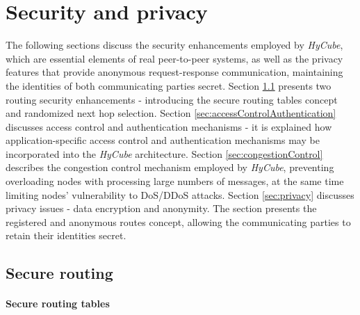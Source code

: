 
\chapter{Security and privacy}
\label{sec:security}

The following sections discuss the security enhancements employed by \emph{HyCube}, which are essential elements of real peer-to-peer systems, as well as the privacy features that provide anonymous request-response communication, maintaining the identities of both communicating parties secret. Section \ref{sec:secureRouting} presents two routing security enhancements - introducing the secure routing tables concept and randomized next hop selection. Section \ref{sec:accessControlAuthentication} discusses access control and authentication mechanisms - it is explained how application-specific access control and authentication mechanisms may be incorporated into the \emph{HyCube} architecture. Section \ref{sec:congestionControl} describes the congestion control mechanism employed by \emph{HyCube}, preventing overloading nodes with processing large numbers of messages, at the same time limiting nodes' vulnerability to DoS/DDoS attacks. Section \ref{sec:privacy} discusses privacy issues - data encryption and anonymity. The section presents the registered and anonymous routes concept, allowing the communicating parties to retain their identities secret.



\section{Secure routing}
\label{sec:secureRouting}

\subsubsection{Secure routing tables}

